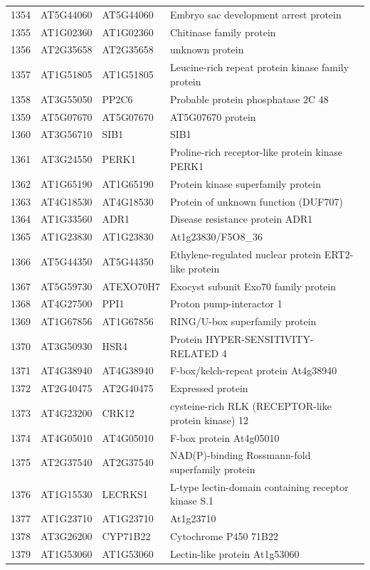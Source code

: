 \documentclass[11pt]{article}
\begin{document}
\begin{center}
\begin{tabular}{rlll}
1354 & AT5G44060 & AT5G44060 & Embryo sac development arrest protein\\
1355 & AT1G02360 & AT1G02360 & Chitinase family protein\\
1356 & AT2G35658 & AT2G35658 & unknown protein\\
1357 & AT1G51805 & AT1G51805 & Leucine-rich repeat protein kinase family protein\\
1358 & AT3G55050 & PP2C6 & Probable protein phosphatase 2C 48\\
1359 & AT5G07670 & AT5G07670 & AT5G07670 protein\\
1360 & AT3G56710 & SIB1 & SIB1\\
1361 & AT3G24550 & PERK1 & Proline-rich receptor-like protein kinase PERK1\\
1362 & AT1G65190 & AT1G65190 & Protein kinase superfamily protein\\
1363 & AT4G18530 & AT4G18530 & Protein of unknown function (DUF707)\\
1364 & AT1G33560 & ADR1 & Disease resistance protein ADR1\\
1365 & AT1G23830 & AT1G23830 & At1g23830/F5O8\_36\\
1366 & AT5G44350 & AT5G44350 & Ethylene-regulated nuclear protein ERT2-like protein\\
1367 & AT5G59730 & ATEXO70H7 & Exocyst subunit Exo70 family protein\\
1368 & AT4G27500 & PPI1 & Proton pump-interactor 1\\
1369 & AT1G67856 & AT1G67856 & RING/U-box superfamily protein\\
1370 & AT3G50930 & HSR4 & Protein HYPER-SENSITIVITY-RELATED 4\\
1371 & AT4G38940 & AT4G38940 & F-box/kelch-repeat protein At4g38940\\
1372 & AT2G40475 & AT2G40475 & Expressed protein\\
1373 & AT4G23200 & CRK12 & cysteine-rich RLK (RECEPTOR-like protein kinase) 12\\
1374 & AT4G05010 & AT4G05010 & F-box protein At4g05010\\
1375 & AT2G37540 & AT2G37540 & NAD(P)-binding Rossmann-fold superfamily protein\\
1376 & AT1G15530 & LECRKS1 & L-type lectin-domain containing receptor kinase S.1\\
1377 & AT1G23710 & AT1G23710 & At1g23710\\
1378 & AT3G26200 & CYP71B22 & Cytochrome P450 71B22\\
1379 & AT1G53060 & AT1G53060 & Lectin-like protein At1g53060\\

\end{tabular}
\end{center}
\end{document}

